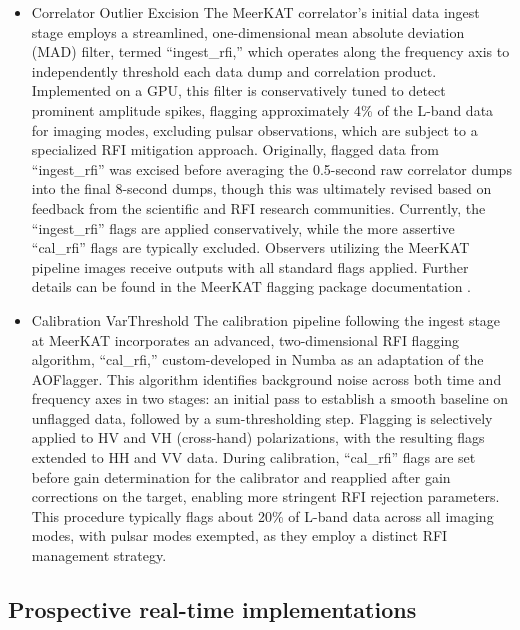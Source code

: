 \begin{itemize}
\item Correlator Outlier Excision
The MeerKAT correlator's initial data ingest stage employs a streamlined, one-dimensional mean absolute deviation (MAD) filter, termed “ingest\_rfi,” which operates along the frequency axis to independently threshold each data dump and correlation product. Implemented on a GPU, this filter is conservatively tuned to detect prominent amplitude spikes, flagging approximately 4\% of the L-band data for imaging modes, excluding pulsar observations, which are subject to a specialized RFI mitigation approach. Originally, flagged data from “ingest\_rfi” was excised before averaging the 0.5-second raw correlator dumps into the final 8-second dumps, though this was ultimately revised based on feedback from the scientific and RFI research communities. Currently, the “ingest\_rfi” flags are applied conservatively, while the more assertive “cal\_rfi” flags are typically excluded. Observers utilizing the MeerKAT pipeline images receive outputs with all standard flags applied. Further details can be found in the MeerKAT flagging package documentation \cite{hugo2022tricolouroptimizedsumthresholdflagger}.

\item Calibration VarThreshold
The calibration pipeline following the ingest stage at MeerKAT incorporates an advanced, two-dimensional RFI flagging algorithm, “cal\_rfi,” custom-developed in Numba as an adaptation of the AOFlagger. This algorithm identifies background noise across both time and frequency axes in two stages: an initial pass to establish a smooth baseline on unflagged data, followed by a sum-thresholding step. Flagging is selectively applied to HV and VH (cross-hand) polarizations, with the resulting flags extended to HH and VV data. During calibration, “cal\_rfi” flags are set before gain determination for the calibrator and reapplied after gain corrections on the target, enabling more stringent RFI rejection parameters. This procedure typically flags about 20\% of L-band data across all imaging modes, with pulsar modes exempted, as they employ a distinct RFI management strategy.


\end{itemize}

\subsection{Prospective real-time implementations}
\label{subsection:hardware:catalog:prospective}

